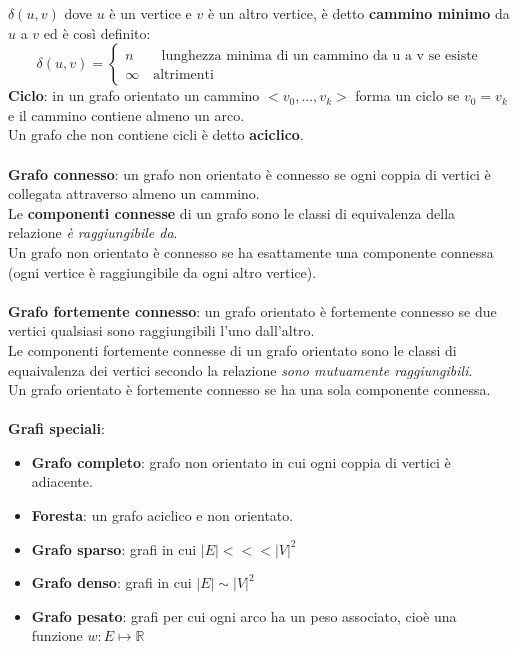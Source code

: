 $\delta(u,v)$ dove $u$ è un vertice e $v$ è un altro vertice, è detto \textbf{cammino minimo} da $u$ a $v$ ed è così definito:
    \begin{equation}
        \delta(u, v) = 
        \begin{cases}
            n \qquad \text{lunghezza minima di un cammino da u a v se esiste}\\
            \infty \quad \text{altrimenti}
        \end{cases}
    \end{equation}
\textbf{Ciclo}: in un grafo orientato un cammino $<v_0, ..., v_k>$ forma un ciclo se $v_0 = v_k$ e il cammino contiene almeno un arco.\\
Un grafo che non contiene cicli è detto \textbf{aciclico}.\\\\
\textbf{Grafo connesso}: un grafo non orientato è connesso se ogni coppia di vertici è collegata attraverso almeno un cammino.\\
Le \textbf{componenti connesse} di un grafo sono le classi di equivalenza della relazione \textit{è raggiungibile da}.\\
Un grafo non orientato è connesso se ha esattamente una componente connessa (ogni vertice è raggiungibile da ogni altro vertice).\\\\
\textbf{Grafo fortemente connesso}: un grafo orientato è fortemente connesso se due vertici qualsiasi sono raggiungibili l'uno dall'altro.\\
Le componenti fortemente connesse di un grafo orientato sono le classi di equaivalenza dei vertici secondo la relazione \textit{sono mutuamente raggiungibili}.\\
Un grafo orientato è fortemente connesso se ha una sola componente connessa.\\\\
\textbf{Grafi speciali}:
    \begin{itemize}
        \item{\textbf{Grafo completo}: grafo non orientato in cui ogni coppia di vertici è adiacente.}
        \item{\textbf{Foresta}: un grafo aciclico e non orientato.}
        \item{\textbf{Grafo sparso}: grafi in cui $|E|<<<|V|^2$}
        \item{\textbf{Grafo denso}: grafi in cui $|E|\sim|V|^2$}
        \item{\textbf{Grafo pesato}: grafi per cui ogni arco ha un peso associato, cioè una funzione $w: E \mapsto \mathbb{R}$}
    \end{itemize}

